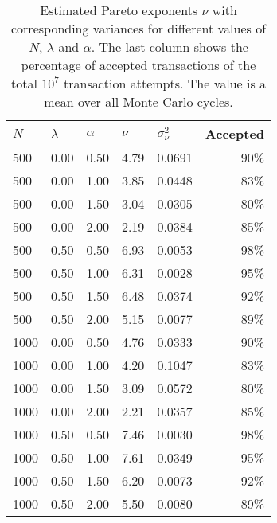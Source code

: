\documentclass{article}
\begin{document}
\begin{table}
\caption{Estimated Pareto exponents $\nu$ with corresponding variances for different values of $N$, $\lambda$ and $\alpha$. The last column shows the percentage of accepted transactions of the total $10^7$ transaction attempts. The value is a mean over all Monte Carlo cycles.}
\label{tab:neighbors}
\begin{tabularx}{\textwidth}{X X X X X r}
\hline
$N$ & $\lambda$ & $\alpha$ & $\nu$ & $\sigma_{\nu}^2$ & Accepted\\
\hline\hline
500 & 0.00 & 0.50 & 4.79 & 0.0691 & 90\%\\
500 & 0.00 & 1.00 & 3.85 & 0.0448 & 83\%\\
500 & 0.00 & 1.50 & 3.04 & 0.0305 & 80\%\\
500 & 0.00 & 2.00 & 2.19 & 0.0384 & 85\%\\
500 & 0.50 & 0.50 & 6.93 & 0.0053 & 98\%\\
500 & 0.50 & 1.00 & 6.31 & 0.0028 & 95\%\\
500 & 0.50 & 1.50 & 6.48 & 0.0374 & 92\%\\
500 & 0.50 & 2.00 & 5.15 & 0.0077 & 89\%\\
1000 & 0.00 & 0.50 & 4.76 & 0.0333 & 90\%\\
1000 & 0.00 & 1.00 & 4.20 & 0.1047 & 83\%\\
1000 & 0.00 & 1.50 & 3.09 & 0.0572 & 80\%\\
1000 & 0.00 & 2.00 & 2.21 & 0.0357 & 85\%\\
1000 & 0.50 & 0.50 & 7.46 & 0.0030 & 98\%\\
1000 & 0.50 & 1.00 & 7.61 & 0.0349 & 95\%\\
1000 & 0.50 & 1.50 & 6.20 & 0.0073 & 92\%\\
1000 & 0.50 & 2.00 & 5.50 & 0.0080 & 89\%\\
\hline
\end{tabularx}
\end{table}
\end{document}
